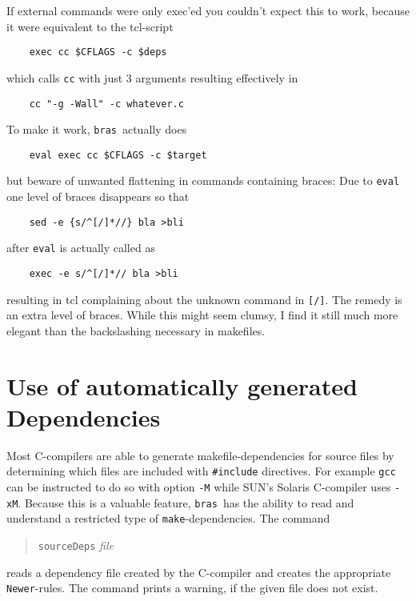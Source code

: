 \documentclass[12pt]{article}
\newcommand{\bras}{\texttt{bras}}
\newcommand{\make}{\texttt{make}}
\begin{document}
If external commands were only exec'ed you couldn't expect this to
work, because it were equivalent to the tcl-script

\begin{verbatim}
    exec cc $CFLAGS -c $deps
\end{verbatim}

which calls \texttt{cc} with just 3 arguments resulting effectively in

\begin{verbatim}
    cc "-g -Wall" -c whatever.c
\end{verbatim}

To make it work, \bras\ actually does

\begin{verbatim}
    eval exec cc $CFLAGS -c $target
\end{verbatim}

but beware of unwanted flattening in commands containing braces: Due
to \texttt{eval} one level of braces
disappears so that

\begin{verbatim}
    sed -e {s/^[/]*//} bla >bli
\end{verbatim}

after \texttt{eval} is actually called as

\begin{verbatim}
    exec -e s/^[/]*// bla >bli
\end{verbatim}

resulting in tcl complaining about the unknown command in
\texttt{[/]}. The remedy is an extra level of braces. While this might
seem clumsy, I find it still much more elegant than the backslashing
necessary in makefiles.



\section{Use of automatically generated Dependencies}

Most C-compilers are able to generate makefile-dependencies for
source files by determining which files are included with
\texttt{\#include} directives. For example \texttt{gcc} can be
instructed to do so with option \texttt{-M} while SUN's Solaris
C-compiler uses \texttt{-xM}. Because this is a valuable feature,
\bras\ has the ability to read and understand a restricted type of
\make-dependencies. The command
\begin{quote}
  \texttt{sourceDeps} \textit{file}
\end{quote}
reads a dependency file created by the C-compiler and creates the
appropriate \texttt{Newer}-rules. The command prints a warning, if
the given file does not exist.
   
\end{document}
